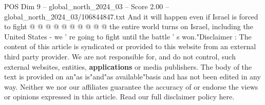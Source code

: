\begin{textsample}{POS Dim 9 – global\_north\_2024\_03 – Score 2.00 – global\_north\_2024\_03/106844847.txt}
And it will happen even if Israel is forced to fight @ @ @ @ @ @ @ @ @ @ the entire world turns on Israel, including the United States - we ' re going to fight until the battle ' s won."Disclaimer : The content of this article is syndicated or provided to this website from an external third party provider.
We are not responsible for, and do not control, such external websites, entities, \textbf{applications} or media publishers.
The body of the text is provided on an"as is"and"as available"basis and has not been edited in any way.
Neither we nor our affiliates guarantee the accuracy of or endorse the views or opinions expressed in this article.
Read our full disclaimer policy here.

\end{textsample}
